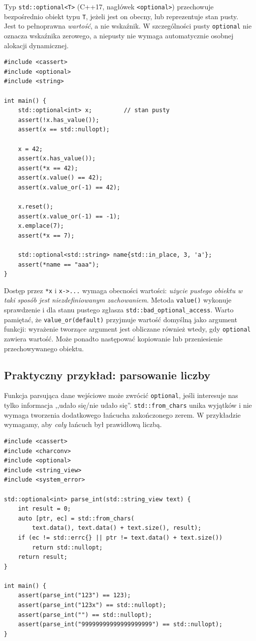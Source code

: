 Typ \texttt{std::optional<T>} (C++17, nagłówek \texttt{<optional>})
przechowuje bezpośrednio obiekt typu \texttt{T}, jeżeli jest on obecny,
lub reprezentuje stan pusty. Jest to pełnoprawna \emph{wartość}, a nie
wskaźnik. W szczególności pusty \texttt{optional} nie oznacza wskaźnika
zerowego, a niepusty nie wymaga automatycznie osobnej alokacji dynamicznej.

\begin{lstlisting}[caption={Najważniejsze operacje optional (C++17); kompletny program.}]
#include <cassert>
#include <optional>
#include <string>

int main() {
    std::optional<int> x;         // stan pusty
    assert(!x.has_value());
    assert(x == std::nullopt);

    x = 42;
    assert(x.has_value());
    assert(*x == 42);
    assert(x.value() == 42);
    assert(x.value_or(-1) == 42);

    x.reset();
    assert(x.value_or(-1) == -1);
    x.emplace(7);
    assert(*x == 7);

    std::optional<std::string> name{std::in_place, 3, 'a'};
    assert(*name == "aaa");
}
\end{lstlisting}

Dostęp przez \texttt{*x} i \texttt{x->...} wymaga obecności wartości:
\emph{użycie pustego obiektu w taki sposób jest niezdefiniowanym
zachowaniem}. Metoda \texttt{value()} wykonuje sprawdzenie i dla stanu
pustego zgłasza \texttt{std::bad\_optional\_access}. Warto pamiętać,
że \texttt{value\_or(default)} przyjmuje wartość domyślną jako argument
funkcji: wyrażenie tworzące argument jest obliczane również wtedy,
gdy \texttt{optional} zawiera wartość. Może ponadto następować kopiowanie
lub przeniesienie przechowywanego obiektu.

\subsection{Praktyczny przykład: parsowanie liczby}

Funkcja parsująca dane wejściowe może zwrócić \texttt{optional}, jeśli
interesuje nas tylko informacja ,,udało się/nie udało się''.
\texttt{std::from\_chars} unika wyjątków i nie wymaga tworzenia dodatkowego
łańcucha zakończonego zerem. W przykładzie wymagamy, aby \emph{cały}
łańcuch był prawidłową liczbą.

\begin{lstlisting}[caption={Parsowanie int do optional (C++17); kompletny program.}]
#include <cassert>
#include <charconv>
#include <optional>
#include <string_view>
#include <system_error>

std::optional<int> parse_int(std::string_view text) {
    int result = 0;
    auto [ptr, ec] = std::from_chars(
        text.data(), text.data() + text.size(), result);
    if (ec != std::errc{} || ptr != text.data() + text.size())
        return std::nullopt;
    return result;
}

int main() {
    assert(parse_int("123") == 123);
    assert(parse_int("123x") == std::nullopt);
    assert(parse_int("") == std::nullopt);
    assert(parse_int("99999999999999999999") == std::nullopt);
}
\end{lstlisting}

